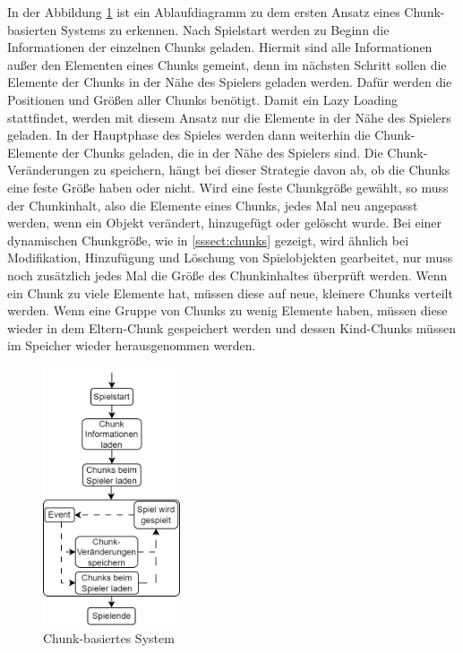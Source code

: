 In der Abbildung \ref{fig:chunkBasedSystem} ist ein Ablaufdiagramm zu dem ersten Ansatz eines Chunk-basierten Systems zu erkennen. Nach Spielstart werden zu Beginn die Informationen der einzelnen Chunks geladen. Hiermit sind alle Informationen außer den Elementen eines Chunks gemeint, denn im nächsten Schritt sollen die Elemente der Chunks in der Nähe des Spielers geladen werden. Dafür werden die Positionen und Größen aller Chunks benötigt. Damit ein Lazy Loading stattfindet, werden mit diesem Ansatz nur die Elemente in der Nähe des Spielers geladen. In der Hauptphase des Spieles werden dann weiterhin die Chunk-Elemente der Chunks geladen, die in der Nähe des Spielers sind. Die Chunk-Veränderungen zu speichern, hängt bei dieser Strategie davon ab, ob die Chunks eine feste Größe haben oder nicht. Wird eine feste Chunkgröße gewählt, so muss der Chunkinhalt, also die Elemente eines Chunks, jedes Mal neu angepasst werden, wenn ein Objekt verändert, hinzugefügt oder gelöscht wurde.  Bei einer dynamischen Chunkgröße, wie in \ref{sssect:chunks} gezeigt, wird ähnlich bei Modifikation, Hinzufügung und Löschung von Spielobjekten gearbeitet, nur muss noch zusätzlich jedes Mal die Größe des Chunkinhaltes überprüft werden. Wenn ein Chunk zu viele Elemente hat, müssen diese auf neue, kleinere Chunks verteilt werden. Wenn eine Gruppe von Chunks zu wenig Elemente haben, müssen diese wieder in dem Eltern-Chunk gespeichert werden und dessen Kind-Chunks müssen im Speicher wieder herausgenommen werden.

\begin{figure}[htp]
    \centering
    \includegraphics[width=0.36\textwidth]{images/Chunkbasiert.png}
    \caption{Chunk-basiertes System}
    \label{fig:chunkBasedSystem}
\end{figure}


